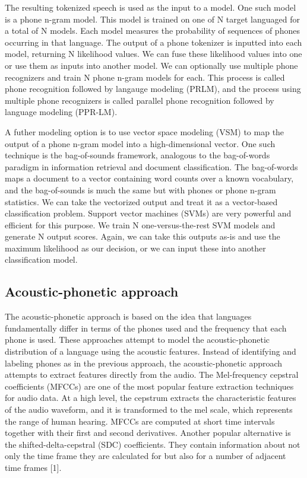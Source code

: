 \documentclass{llncs}
\begin{document}
The resulting tokenized speech is used as the input to a model. One such model is a phone n-gram model. This model is trained on one of N target languaged for a total of N models. Each model measures the probability of sequences of phones occurring in that language. The output of a phone tokenizer is inputted into each model, returning N likelihood values. We can fuse these likelihood values into one or use them as inputs into another model. We can optionally use multiple phone recognizers and train N phone n-gram models for each. This process is called phone recognition followed by langauge modeling (PRLM), and the process using multiple phone recognizers is called parallel phone recognition followed by language modeling (PPR-LM).

A futher modeling option is to use vector space modeling (VSM) to map the output of a phone n-gram model into a high-dimensional vector. One such technique is the bag-of-sounds framework, analogous to the bag-of-words paradigm in information retrieval and document classification. The bag-of-words maps a document to a vector containing word counts over a known vocabulary, and the bag-of-sounds is much the same but with phones or phone n-gram statistics. We can take the vectorized output and treat it as a vector-based classification problem. Support vector machines (SVMs) are very powerful and efficient for this purpose. We train N one-versus-the-rest SVM models and generate N output scores. Again, we can take this outputs as-is and use the maximum likelihood as our decision, or we can input these into another classification model.

\subsection{Acoustic-phonetic approach}
The acoustic-phonetic approach is based on the idea that languages fundamentally differ in terms of the phones used and the frequency that each phone is used. These approaches attempt to model the acoustic-phonetic distribution of a language using the acoustic features. Instead of identifying and labeling phones as in the previous approach, the acoustic-phonetic approach attempts to extract features directly from the audio. The Mel-frequency cepstral coefficients (MFCCs) are one of the most popular feature extraction techniques for audio data. At a high level, the cepstrum extracts the characteristic features of the audio waveform, and it is transformed to the mel scale, which represents the range of human hearing. MFCCs are computed at short time intervals together with their first and second derivatives. Another popular alternative is the shifted-delta-cepstral (SDC) coefficients. They contain information about not only the time frame they are calculated for but also for a number of adjacent time frames [1].
\end{document}
